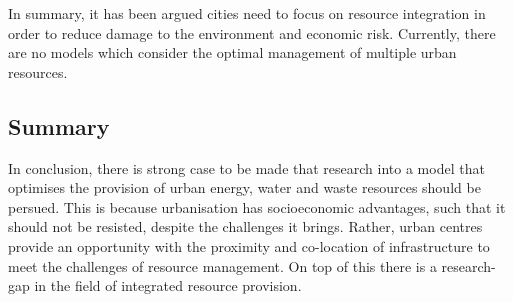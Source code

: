 In summary, it has been argued cities need to focus on resource integration in order to reduce damage to the environment and economic risk. Currently, there are no models which consider the optimal management of multiple urban resources.

\subsection{Summary}
In conclusion, there is strong case to be made that research into a model that optimises the provision of urban energy, water and waste resources should be persued. This is because urbanisation has socioeconomic advantages, such that it should not be resisted, despite the challenges it brings. Rather, urban centres provide an opportunity with the proximity and co-location of infrastructure to meet the challenges of resource management. On top of this there is a research-gap in the field of integrated resource provision.
